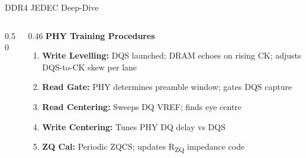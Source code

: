 \documentclass[aspectratio=169,10pt]{beamer}
\begin{document}
\begin{frame}{DDR4 JEDEC Deep-Dive}
\begin{columns}[T]
\begin{column}{0.50\textwidth}
{}
    \end{column}

    \begin{column}{0.46\textwidth}
      {\small\textbf{\color{ddrgold}PHY Training Procedures}}\\[6pt]
      {\footnotesize
      \begin{enumerate}\setlength\itemsep{5pt}
        \item \textbf{Write Levelling:} DQS launched; DRAM echoes on rising CK; adjusts DQS-to-CK skew per lane
        \item \textbf{Read Gate:} PHY determines preamble window; gates DQS capture
        \item \textbf{Read Centering:} Sweeps DQ VREF; finds eye centre
        \item \textbf{Write Centering:} Tunes PHY DQ delay vs DQS
        \item \textbf{ZQ Cal:} Periodic ZQCS; updates R\textsubscript{ZQ} impedance code
      \end{enumerate}}
    \end{column}

  \end{columns}
\end{frame}
\end{document}
